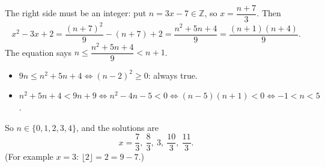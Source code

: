 The right side must be an integer: put $n=3x-7\in\mathbb Z$, so $x=\dfrac{n+7}{3}$. Then
\[
x^2-3x+2=\dfrac{(n+7)^2}{9}-(n+7)+2=\dfrac{n^2+5n+4}{9}=\dfrac{(n+1)(n+4)}{9}.
\]
The equation says $n\le\dfrac{n^2+5n+4}{9}<n+1$.
\begin{itemize}
\item $9n\le n^2+5n+4\iff(n-2)^2\ge0$: always true.
\item $n^2+5n+4<9n+9\iff n^2-4n-5<0\iff(n-5)(n+1)<0\iff-1<n<5$.
\end{itemize}
So $n\in\{0,1,2,3,4\}$, and the solutions are
\[
\boxed{x=\dfrac{7}{3},\ \dfrac{8}{3},\ 3,\ \dfrac{10}{3},\ \dfrac{11}{3}} .
\]
(For example $x=3$: $\lfloor2\rfloor=2=9-7$.)
